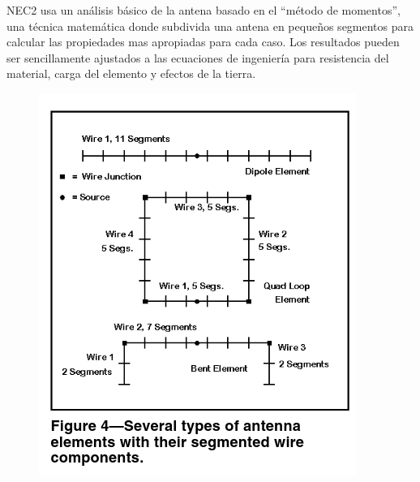 \documentclass[12pt]{article}
\begin{document}
NEC2 usa un análisis básico de la antena basado en el ``método de momentos'',
una técnica matemática donde subdivida una antena en pequeños segmentos para
calcular las propiedades mas apropiadas para cada caso. Los resultados pueden
ser sencillamente ajustados a las ecuaciones de ingeniería para resistencia del
material, carga del elemento y efectos de la tierra. 

\begin{figure}[H]
\centering
\includegraphics[width=.4\linewidth]{images/Captura de pantalla de 2021-09-12 23-21-26.png}
\end{figure}
\end{document}
